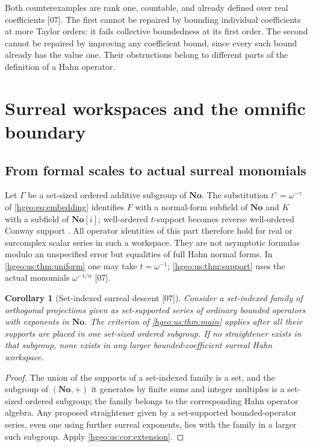 \documentclass[11pt,letterpaper]{article}
\numberwithin{equation}{section}
\newtheorem{corollary}[corollary]{Corollary}
\theoremstyle{definition}
\theoremstyle{remark}
\newcommand{\No}{\mathbf{No}}
\newcommand{\F}{F}
\newcommand{\K}{K}
\newcommand{\src}[1]{\textup{\textsf{\small[#1]}}}
\begin{document}
Both counterexamples are rank one, countable, and already defined over real
coefficients \src{07}. The first cannot be repaired by bounding individual
coefficients at more Taylor orders: it fails collective boundedness at its
first order. The second cannot be repaired by improving any coefficient bound,
since every such bound already has the value one. Their obstructions belong to
different parts of the definition of a Hahn operator.

\section{Surreal workspaces and the omnific boundary}\label{hgeo:us:sec:surreal}

\subsection{From formal scales to actual surreal monomials}
Let $\Gamma$ be a set-sized ordered additive subgroup of $\No$. The
substitution $t^\gamma=\omega^{-\gamma}$ of \eqref{hgeo:eq:embedding}
identifies $\F$ with a normal-form subfield of $\No$ and $\K$ with a subfield
of $\No[i]$; well-ordered $t$-support becomes reverse well-ordered Conway
support \cite{Conway,LInnocenteMantova}. All operator identities of this part
therefore hold for real or surcomplex scalar series in such a workspace. They
are not asymptotic formulas modulo an unspecified error but equalities of full
Hahn normal forms. In \cref{hgeo:us:thm:uniform} one may take $t=\omega^{-1}$;
\cref{hgeo:us:thm:support} uses the actual monomials $\omega^{-1/n}$
\src{07}.

\begin{corollary}[Set-indexed surreal descent \src{07}]\label{hgeo:us:cor:surreal}
Consider a set-indexed family of orthogonal projections given as set-supported
series of ordinary bounded operators with exponents in $\No$. The criterion of
\cref{hgeo:us:thm:main} applies after all their supports are placed in one
set-sized ordered subgroup. If no straightener exists in that subgroup, none
exists in any larger bounded-coefficient surreal Hahn workspace.
\end{corollary}
\begin{proof}
The union of the supports of a set-indexed family is a set, and the subgroup
of $(\No,+)$ it generates by finite sums and integer multiples is a set-sized
ordered subgroup; the family belongs to the corresponding Hahn operator
algebra. Any proposed straightener given by a set-supported bounded-operator
series, even one using further surreal exponents, lies with the family in a
larger such subgroup. Apply \cref{hgeo:us:cor:extension}.
\end{proof}
\end{document}
